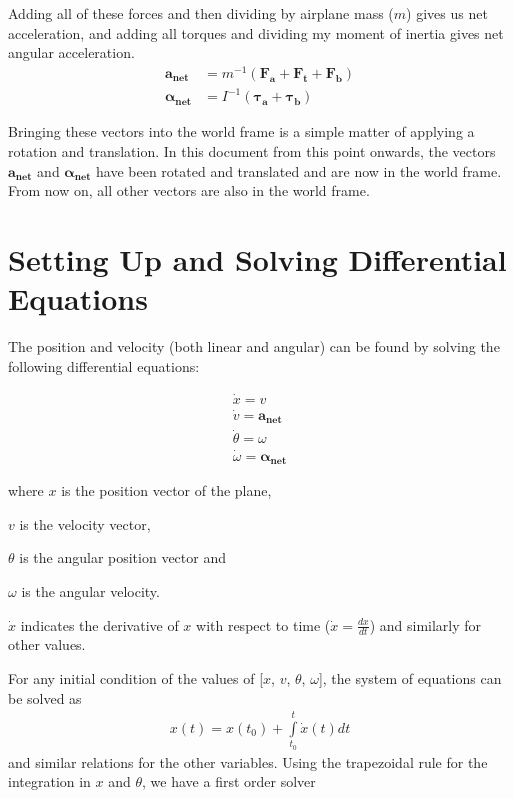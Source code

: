 \documentclass[10pt,a4paper]{article}
\begin{document}
Adding all of these forces and then dividing by airplane mass ($m$) gives us net acceleration, and adding all torques and dividing my moment of inertia gives net angular acceleration.
\begin{align}
\boldsymbol{a_{net}} &= m^{-1}(\boldsymbol{F_a} + \boldsymbol{F_t} + \boldsymbol{F_b})\\
\boldsymbol{\alpha_{net}} &= I^{-1}(\boldsymbol{\tau_a} + \boldsymbol{\tau_b})
\end{align}

Bringing these vectors into the world frame is a simple matter of applying a rotation and translation. In this document from this point onwards, the vectors $\boldsymbol{a_{net}}$ and $\boldsymbol{\alpha_{net}}$ have been rotated and translated and are now in the world frame. From now on, all other vectors are also in the world frame.

\section{Setting Up and Solving Differential Equations}
The position and velocity (both linear and angular) can be found by solving the following differential equations:

\begin{align}
\dot{x} = v \\
\dot{v} = \boldsymbol{a_{net}} \\
\dot{\theta} = \omega \\
\dot{\omega} = \boldsymbol{\alpha_{net}}
\end{align}

where $x$ is the position vector of the plane,

$v$ is the velocity vector,

$\theta$ is the angular position vector and

$\omega$ is the angular velocity.

$\dot{x}$ indicates the derivative of $x$ with respect to time ($\dot{x} = \frac{dx}{dt}$) and similarly for other values.

For any initial condition of the values of [$x$, $v$, $\theta$, $\omega$], the system of equations can be solved as
\begin{align}
x(t) = x(t_0) + \int\limits_{t_0}^{t}\dot{x}(t) dt
\end{align}
and similar relations for the other variables. Using the trapezoidal rule for the integration in $x$ and $\theta$, we have a first order solver
\end{document}
